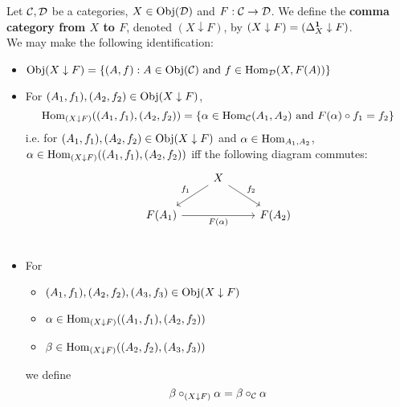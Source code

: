\documentclass{book}
\begin{document}
	\begin{defn}
		Let $\mathcal{C}, \mathcal{D}$ be a categories, $X \in \operatorname{Obj}(\mathcal{D})$ and $F: \mathcal{C} \rightarrow \mathcal{D}$. We define the \textbf{comma category from $X$ to $F$}, denoted $(X \downarrow F)$, by $(X \downarrow F) = (\Delta^{\operatorname*{\mathbf{1}}}_X \downarrow F)$. \\
		We may make the following identification:
		\begin{itemize}
			\item $\operatorname{Obj}(X \downarrow F) = \{(A, f): A \in \operatorname{Obj}(\mathcal{C}) \text{ and } f \in \operatorname{Hom}_{\mathcal{D}}(X, F(A))\}$ 
			\item For $(A_1, f_1), (A_2, f_2) \in \operatorname{Obj}(X \downarrow F)$, 
			$$\operatorname{Hom}_{(X \downarrow F)}((A_1, f_1), (A_2, f_2)) = \{\alpha \in \operatorname{Hom}_{\mathcal{C}}(A_1, A_2) \text{ and } F(\alpha) \circ f_1 = f_2\}$$
			i.e. for $(A_1, f_1), (A_2, f_2) \in \operatorname{Obj}(X \downarrow F)$ and $\alpha \in \operatorname{Hom}_{A_1, A_2}$, $\alpha \in \operatorname{Hom}_{(X \downarrow F)}((A_1, f_1), (A_2, f_2))$ iff the following diagram commutes:
			\[ 
			\begin{tikzcd}
				&  X \arrow[dl, "f_1"']  \arrow[dr, "f_2"] & \\
				F(A_1)  \arrow[rr, "F(\al)"'] &&  F(A_2) \\ 
			\end{tikzcd}
			\]
			\item For 
			\begin{itemize}
				\item $(A_1, f_1), (A_2, f_2), (A_3, f_3) \in \operatorname{Obj}(X \downarrow F)$
				\item $\alpha \in \operatorname{Hom}_{(X \downarrow F)}((A_1, f_1), (A_2, f_2))$
				\item $\beta \in \operatorname{Hom}_{(X \downarrow F)}((A_2, f_2), (A_3, f_3))$
			\end{itemize}
			we define 
			$$\beta \circ_{(X \downarrow F)} \alpha = \beta \circ_{\mathcal{C}} \alpha $$
		\end{itemize}
	\end{defn}
\end{document}
